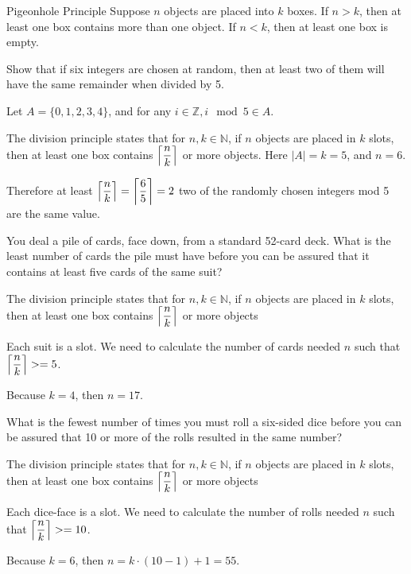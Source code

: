 \documentclass[openany, 12pt]{book}
\begin{document}
\begin{definition}{Pigeonhole Principle}{}
	Suppose $n$ objects are placed into $k$ boxes.
	If $n>k$, then at least one box contains more than one object.
	If $n<k$, then at least one box is empty.
\end{definition}

\begin{exercise}{}{}
	Show that if six integers are chosen at random, then at
	least two of them will have the same remainder when divided by 5.
	\begin{alist}
		\item Let $A=\{0, 1, 2, 3, 4\}$, and for any $i\in\mathbb{Z}, i\mod 5 \in
			A$.
		\item The division principle states that for $n, k\in \mathbb{N}$, if $n$
		objects are placed in $k$ slots, then at least one box contains
		$\left\lceil\dfrac{n}{k}\right\rceil$ or more objects. Here $|A|=k=5$, and $n=6$.
		\item Therefore at least $\left\lceil\dfrac{n}{k}\right\rceil=\left\lceil\dfrac{6}{5}\right\rceil=2$
		two of the randomly chosen integers mod 5 are the same value.
	\end{alist}
\end{exercise}

\begin{exercise}{}{}
	You deal a pile of cards, face down, from a standard
	52-card deck. What is the least number of cards the pile must have before
	you can be assured that it contains at least five cards of the same suit?
	\begin{alist}
		\item The division principle states that for $n, k\in \mathbb{N}$, if $n$
		objects are placed in $k$ slots, then at least one box contains
		$\left\lceil\dfrac{n}{k}\right\rceil$ or more objects
		\item Each suit is a slot. We need to calculate the number of cards needed
		$n$ such that $\left\lceil\dfrac{n}{k}\right\rceil>=5$.
		\item Because $k=4$, then $n=17$.
	\end{alist}
\end{exercise}

\begin{exercise}{}{}
	What is the fewest number of times you must roll a
	six-sided dice before you can be assured that 10 or more of the rolls
	resulted in the same number?
	\begin{alist}
		\item The division principle states that for $n, k\in \mathbb{N}$, if $n$
		objects are placed in $k$ slots, then at least one box contains
		$\left\lceil\dfrac{n}{k}\right\rceil$ or more objects
		\item Each dice-face is a slot. We need to calculate the number of rolls needed
		$n$ such that $\left\lceil\dfrac{n}{k}\right\rceil>=10$.
		\item Because $k=6$, then $n=k\cdot(10 -1)+ 1 = 55$.
	\end{alist}
\end{exercise}
\end{document}
